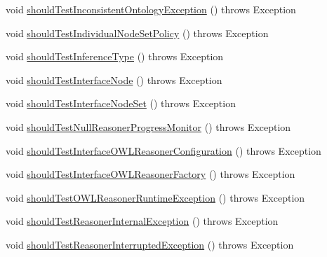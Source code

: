 \begin{DoxyCompactItemize}
\item 
void \hyperlink{classorg_1_1semanticweb_1_1owlapi_1_1contract_1_1_contract_reasoner_test_a76b9318c575e4629d3eab1819b0ea3e2}{should\-Test\-Inconsistent\-Ontology\-Exception} ()  throws Exception 
\item 
void \hyperlink{classorg_1_1semanticweb_1_1owlapi_1_1contract_1_1_contract_reasoner_test_a1d80d743d54361b17594cfa7ac146968}{should\-Test\-Individual\-Node\-Set\-Policy} ()  throws Exception 
\item 
void \hyperlink{classorg_1_1semanticweb_1_1owlapi_1_1contract_1_1_contract_reasoner_test_a702dfce9fd06464e9ea527952cabbb13}{should\-Test\-Inference\-Type} ()  throws Exception 
\item 
void \hyperlink{classorg_1_1semanticweb_1_1owlapi_1_1contract_1_1_contract_reasoner_test_a5308e4bfc2f792ec973b6ded2b462144}{should\-Test\-Interface\-Node} ()  throws Exception 
\item 
void \hyperlink{classorg_1_1semanticweb_1_1owlapi_1_1contract_1_1_contract_reasoner_test_a44a7eef924c84ba15458a24ab1b1aa93}{should\-Test\-Interface\-Node\-Set} ()  throws Exception 
\item 
void \hyperlink{classorg_1_1semanticweb_1_1owlapi_1_1contract_1_1_contract_reasoner_test_a72bf0bac0cb68e36de6954d2fa99b051}{should\-Test\-Null\-Reasoner\-Progress\-Monitor} ()  throws Exception 
\item 
void \hyperlink{classorg_1_1semanticweb_1_1owlapi_1_1contract_1_1_contract_reasoner_test_afca20891f7742bfe5c5787faf7bf7eff}{should\-Test\-Interface\-O\-W\-L\-Reasoner\-Configuration} ()  throws Exception 
\item 
void \hyperlink{classorg_1_1semanticweb_1_1owlapi_1_1contract_1_1_contract_reasoner_test_a4ec3a10fe99c244456e59f56c106ed06}{should\-Test\-Interface\-O\-W\-L\-Reasoner\-Factory} ()  throws Exception 
\item 
void \hyperlink{classorg_1_1semanticweb_1_1owlapi_1_1contract_1_1_contract_reasoner_test_a263d7ae539c34c5b2fc69452bc8037ab}{should\-Test\-O\-W\-L\-Reasoner\-Runtime\-Exception} ()  throws Exception 
\item 
void \hyperlink{classorg_1_1semanticweb_1_1owlapi_1_1contract_1_1_contract_reasoner_test_a60cb82e5c2004be2e8406f23dd688401}{should\-Test\-Reasoner\-Internal\-Exception} ()  throws Exception 
\item 
void \hyperlink{classorg_1_1semanticweb_1_1owlapi_1_1contract_1_1_contract_reasoner_test_aedc787c8220b141c5183b0386c3f871c}{should\-Test\-Reasoner\-Interrupted\-Exception} ()  throws Exception 

\end{DoxyCompactItemize}
